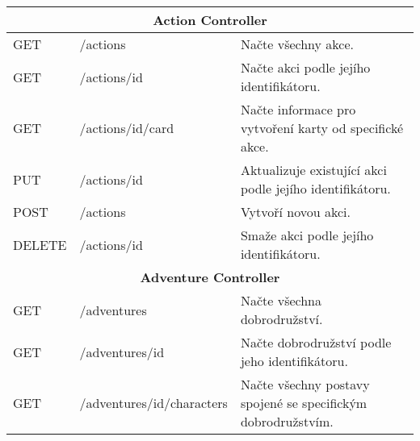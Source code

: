 \begin{longtable}{|l|l|p{}|}
    \multicolumn{3}{|c|}{\textbf{Action Controller}}                                                                                                                                           \\
    \hline
    GET             & /actions                    & Načte všechny akce.                                                                                                                        \\
    GET             & /actions/{id}               & Načte akci podle jejího identifikátoru.                                                                                                    \\
    GET             & /actions/{id}/card          & Načte informace pro vytvoření karty od specifické akce.                                                                                    \\
    PUT             & /actions/{id}               & Aktualizuje existující akci podle jejího identifikátoru.                                                                                   \\
    POST            & /actions                    & Vytvoří novou akci.                                                                                                                        \\
    DELETE          & /actions/{id}               & Smaže akci podle jejího identifikátoru.                                                                                                    \\
    \hline
    \multicolumn{3}{|c|}{\textbf{Adventure Controller}}                                                                                                                                        \\
    \hline
    GET             & /adventures                 & Načte všechna dobrodružství.                                                                                                               \\
    GET             & /adventures/{id}            & Načte dobrodružství podle jeho identifikátoru.                                                                                             \\
    GET             & /adventures/{id}/characters & Načte všechny postavy spojené se specifickým dobrodružstvím.                                                                               \\

\end{longtable}
